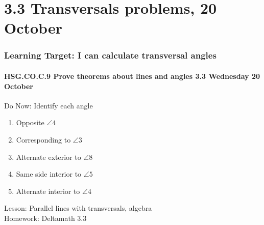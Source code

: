 \documentclass{beamer}
\begin{document}
\section{3.3 Transversals problems, 20 October}
\frame
{
  \frametitle{Learning Target: I can calculate transversal angles}
  \framesubtitle{HSG.CO.C.9 Prove theorems about lines and angles  \hfill \alert{3.3 Wednesday 20 October}}
  \begin{block}{Do Now: Identify each angle}
    \begin{multicols}{2}
    \begin{enumerate}
      \item Opposite $\angle 4$
      \item Corresponding to $\angle 3$
      \item Alternate exterior to $\angle 8$
      \item Same side interior to $\angle 5$
      \item Alternate interior to $\angle 4$
  \end{enumerate}
  \begin{center}
  \end{center}
\end{multicols}
\end{block}
  Lesson: Parallel lines with transversals, algebra \\[0.25cm]
  Homework: Deltamath 3.3
}
\end{document}
